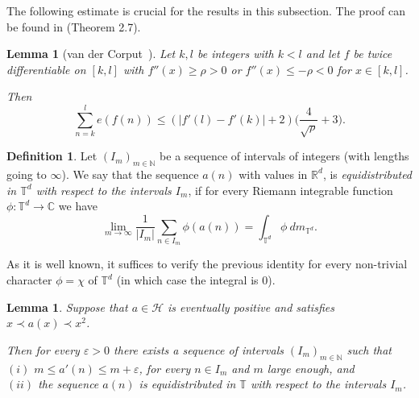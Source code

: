 \documentclass[11pt]{amsart}
\renewcommand{\H}{\mathcal{H}}
\newcommand{\C}{\mathbb{C}}
\newcommand{\T}{\mathbb{T}}
\newcommand{\R}{\mathbb{R}}
\newcommand{\N}{\mathbb{N}}
\theoremstyle{plain}
\newtheorem{lemma}[theorem]{Lemma}
\theoremstyle{definition}
\newtheorem{definition}[theorem]{Definition}
\theoremstyle{remark}
\begin{document}
 The following estimate is crucial for the
results in this subsection. The proof can be found in \cite{KN}
(Theorem 2.7).

\begin{lemma}[van der Corput~\cite{VdC}]\label{L:VDC2}
  Let $k,l$ be integers with $k<l$ and let $f$ be twice differentiable
  on $[k,l]$ with $f''(x)\geq \rho>0$ or $f''(x)\leq -\rho<0$ for
  $x\in [k,l]$.

  Then
$$
\sum_{n=k}^l e(f(n))\leq
(|f'(l)-f'(k)|+2)\Big(\frac{4}{\sqrt{\rho}}+3\Big).
$$
\end{lemma}

\begin{definition}Let $(I_m)_{m\in\N}$ be a sequence of intervals of
  integers (with lengths going to $\infty$). We say that the sequence
  $a(n)$ with values in $\R^d$, is \emph{equidistributed in $\T^d$
    with respect to the intervals $I_m$}, if for every Riemann
  integrable function $\phi\colon \T^d\to \C$ we have
$$
\lim_{m\to\infty} \frac{1}{|I_m|} \sum_{n\in I_m}
\phi(a(n))=\int_{\T^d} \phi \ dm_{\T^d}.
$$
\end{definition}
As it is well known, it suffices to verify the previous identity for
every non-trivial character $\phi=\chi$ of $\T^d$ (in which case the
integral is $0$).
\begin{lemma}\label{L:equi1}
  Suppose that $a\in\H$ is eventually positive and satisfies $x\prec
  a(x)\prec x^{2}$.

  Then for every $\varepsilon>0$ there exists a
  sequence of intervals
  $(I_m)_{m\in\N}$  such that \\
  $(i)$ $m\leq a'(n)\leq m+\varepsilon$, for every $n\in I_m$ and $m$ large enough, and \\
  $(ii)$ the sequence $a(n)$ is equidistributed in $\T$ with respect
  to the intervals $I_m$.
\end{lemma}
\end{document}
